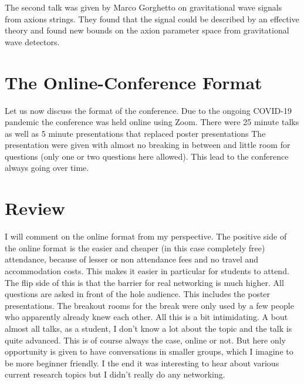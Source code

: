 \documentclass[a4paper]{article}
\begin{document}
\noindent
The second talk was given by Marco Gorghetto on gravitational wave signals
from axions strings. They found that the signal could be described by an effective theory
and found new bounds on the axion parameter space from gravitational wave detectors.

\section{The Online-Conference Format}
Let us now discuss the format of the conference.
Due to the ongoing COVID-19 pandemic the conference was held online using Zoom.
There were 25 minute talks as well as 5 minute presentations that replaced poster presentations
The presentation were given with almost no breaking in between and little room for questions (only one or two
questions here allowed). This lead to the conference always going over time.

\section{Review}
I will comment on the online format from my perspective.
The positive side of the online format is the easier and cheaper (in this case completely free)
attendance, because of lesser or non attendance fees and no travel and accommodation costs.
This makes it easier in particular for students to attend.
The flip side of this is that the barrier for real networking is much higher.
All questions are asked in front of the hole audience. This includes the
poster presentations. The breakout rooms for the break were only used by a few people who apparently already knew
each other.
All this is a bit intimidating. A bout almost all
talks, as a student, I don't know a lot about the topic and the talk is quite advanced.
This is of course always the case, online or not. But here only opportunity is given to have
conversations in smaller groups, which I imagine to be more beginner friendly.
I the end it was interesting to hear about various current research topics but
I didn't really do any networking.



\newpage
\printbibliography
\end{document}
